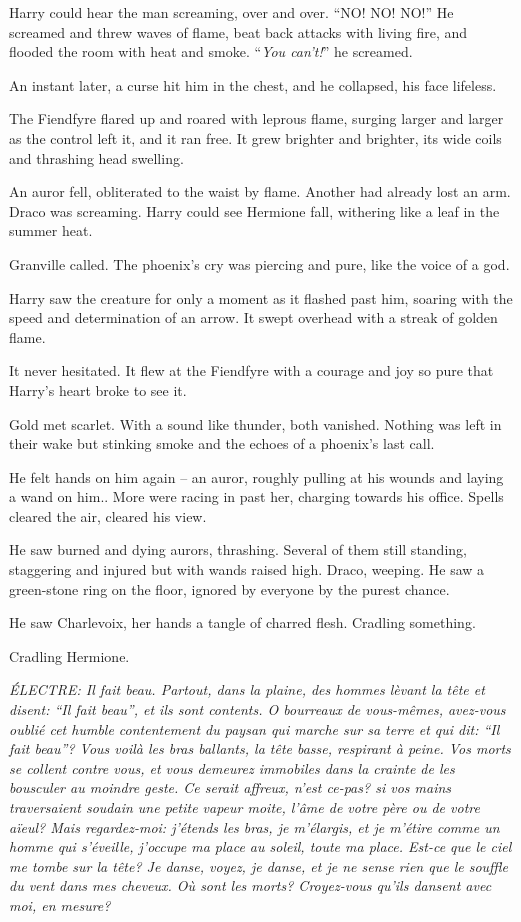 Harry could hear the man screaming, over and over. ``NO! NO! NO!'' He
screamed and threw waves of flame, beat back attacks with living fire,
and flooded the room with heat and smoke. ``\emph{You can't!}'' he
screamed.

An instant later, a curse hit him in the chest, and he collapsed, his
face lifeless.

The Fiendfyre flared up and roared with leprous flame, surging larger
and larger as the control left it, and it ran free. It grew brighter and
brighter, its wide coils and thrashing head swelling.

An auror fell, obliterated to the waist by flame. Another had already
lost an arm. Draco was screaming. Harry could see Hermione fall,
withering like a leaf in the summer heat.

Granville called. The phoenix's cry was piercing and pure, like the
voice of a god.

Harry saw the creature for only a moment as it flashed past him, soaring
with the speed and determination of an arrow. It swept overhead with a
streak of golden flame.

It never hesitated. It flew at the Fiendfyre with a courage and joy so
pure that Harry's heart broke to see it.

Gold met scarlet. With a sound like thunder, both vanished. Nothing was
left in their wake but stinking smoke and the echoes of a phoenix's last
call.

He felt hands on him again -- an auror, roughly pulling at his wounds
and laying a wand on him.. More were racing in past her, charging
towards his office. Spells cleared the air, cleared his view.

He saw burned and dying aurors, thrashing. Several of them still
standing, staggering and injured but with wands raised high. Draco,
weeping. He saw a green-stone ring on the floor, ignored by everyone by
the purest chance.

He saw Charlevoix, her hands a tangle of charred flesh. Cradling
something.

Cradling Hermione.

\mybreak

\emph{ÉLECTRE: Il fait beau. Partout, dans la plaine, des hommes lèvant
la tête et disent: ``Il fait beau'', et ils sont contents. O bourreaux
de vous-mêmes, avez-vous oublié cet humble contentement du paysan qui
marche sur sa terre et qui dit: ``Il fait beau''? Vous voilà les bras
ballants, la tête basse, respirant à peine. Vos morts se collent contre
vous, et vous demeurez immobiles dans la crainte de les bousculer au
moindre geste. Ce serait affreux, n'est ce-pas? si vos mains
traversaient soudain une petite vapeur moite, l'âme de votre père ou de
votre aïeul? Mais regardez-moi: j'étends les bras, je m'élargis, et je
m'étire comme un homme qui s'éveille, j'occupe ma place au soleil, toute
ma place. Est-ce que le ciel me tombe sur la tête? Je danse, voyez, je
danse, et je ne sense rien que le souffle du vent dans mes cheveux. Où
sont les morts? Croyez-vous qu'ils dansent avec moi, en mesure?}\\

